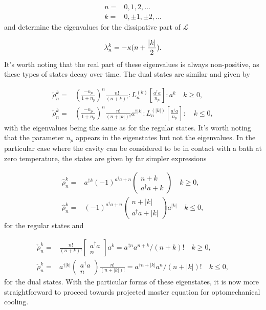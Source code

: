\documentclass[12pt]{article}
\begin{document}
\begin{align}
    n=&0,1,2,\dots \\
    k=&0,\pm 1,\pm 2, \dots
\end{align} and determine the eigenvalues for the dissipative part of $\mathcal{L}$

\begin{equation}
    \lambda_n^k=-\kappa (n+\frac{\abs{k}}{2}).
\end{equation} It's worth noting that the real part of these eigenvalues is always non-positive, as these types of states decay over time. The dual states are similar and given by

\begin{align}
    \check{\rho}_n^k=&(\frac{-n_p}{1+n_p})^{n} \frac{n !}{(n+k) !}: L_{n}^{(k)}\left[\frac{a^{\dagger} a}{n_p}\right]: a^{k} \quad  k \geq 0, \nonumber \\
   \check{\rho}_n^k=&(\frac{-n_p}{1+n_p})^{n} \frac{n !}{(n+|k|) !} a^{\dagger|k|}: L_{n}^{(|k|)}\left[\frac{a^{\dagger} a}{n_p}\right]: \quad k \leq 0, \nonumber
\end{align} with the eigenvalues being the same as for the regular states. It's worth noting that the parameter $n_p$ appears in the eigenstates but not the eigenvalues. In the particular case where the cavity can be considered to be in contact with a bath at zero temperature, the states are given by far simpler expressions

\begin{align}
    \hat{\rho}_n^k=&\nonumber a^{\dagger k}(-1)^{a^{\dagger} a+n}(\begin{array}{c}
n+k \\
a^{\dagger} a+k
\end{array}) \quad k \geq 0, \\
\hat{\rho}_n^k=& \nonumber (-1)^{a^{\dagger} a+n}(\begin{array}{c}
n+|k| \\
a^{\dagger} a+|k|
\end{array}) a^{|k|} \quad k \leq 0,
\end{align} for the regular states and 

\begin{align}
    \check{\rho}_n^k =&\nonumber  \frac{n !}{(n+k) !}\left[\begin{array}{c}
a^{\dagger} a \\
n
\end{array}\right] a^{k}=a^{\dagger n} a^{n+k} /(n+k) ! \quad k \geq 0,\\
\check{\rho}_n^k =&\nonumber a^{\dagger|k|}(\begin{array}{c}
a^{\dagger} a \\
n
\end{array}) \frac{n !}{(n+|k|) !}=a^{\dagger n+|k|} a^{n} /(n+|k|) ! \quad k \leq 0,
\end{align} for the dual states. With the particular forms of these eigenstates, it is now more straightforward to proceed towards projected master equation for optomechanical cooling.
\end{document}
